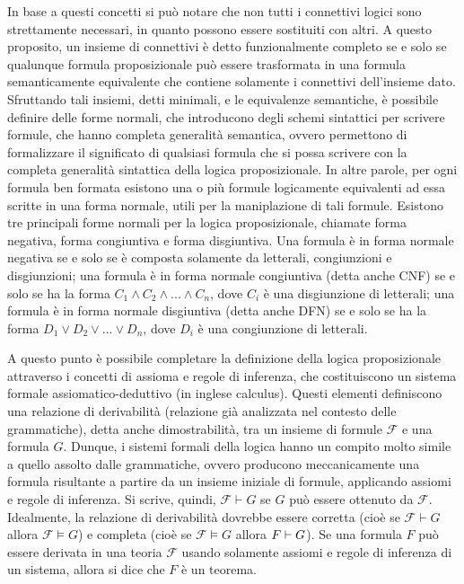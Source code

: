 In base a questi concetti si può notare che non tutti i connettivi logici sono strettamente necessari, in quanto possono essere sostituiti con altri. A questo proposito, un insieme di connettivi è detto funzionalmente completo se e solo se qualunque formula proposizionale può essere trasformata in una formula semanticamente equivalente che contiene solamente i connettivi dell'insieme dato. Sfruttando tali insiemi, detti minimali, e le equivalenze semantiche, è possibile definire delle forme normali, che introducono degli schemi sintattici per scrivere formule, che hanno completa generalità semantica, ovvero permettono di formalizzare il significato di qualsiasi formula che si possa scrivere con la completa generalità sintattica della logica proposizionale. In altre parole, per ogni formula ben formata esistono una o più formule logicamente equivalenti ad essa scritte in una forma normale, utili per la maniplazione di tali formule. Esistono tre principali forme normali per la logica proposizionale, chiamate forma negativa, forma congiuntiva e forma disgiuntiva. Una formula è in forma normale negativa se e solo se è composta solamente da letterali, congiunzioni e disgiunzioni; una formula è in forma normale congiuntiva (detta anche CNF) se e solo se ha la forma \(C_1 \wedge C_2 \wedge ... \wedge C_n\), dove \(C_i\) è una disgiunzione di letterali; una formula è in forma normale disgiuntiva (detta anche DFN) se e solo se ha la forma \(D_1 \vee D_2 \vee ... \vee D_n\), dove \(D_i\) è una congiunzione di letterali. 

A questo punto è possibile completare la definizione della logica proposizionale attraverso i concetti di assioma e regole di inferenza, che costituiscono un sistema formale assiomatico-deduttivo (in inglese calculus). Questi elementi definiscono una relazione di derivabilità (relazione già analizzata nel contesto delle grammatiche), detta anche dimostrabilità, tra un insieme di formule \(\mathcal F\) e una formula \(G\). Dunque, i sistemi formali della logica hanno un compito molto simile a quello assolto dalle grammatiche, ovvero producono meccanicamente una formula risultante a partire da un insieme iniziale di formule, applicando assiomi e regole di inferenza. Si scrive, quindi, \(\mathcal F \vdash G\) se \(G\) può essere ottenuto da \(\mathcal F\). Idealmente, la relazione di derivabilità dovrebbe essere corretta (cioè se \(\mathcal F \vdash G\) allora \(\mathcal F \vDash G\)) e completa (cioè se \(\mathcal F\vDash G\) allora \(\mathcal \mathcal F\vdash G\)). Se una formula \(F\) può essere derivata in una teoria \(\mathcal F\) usando solamente assiomi e regole di inferenza di un sistema, allora si dice che \(F\) è un teorema. 

